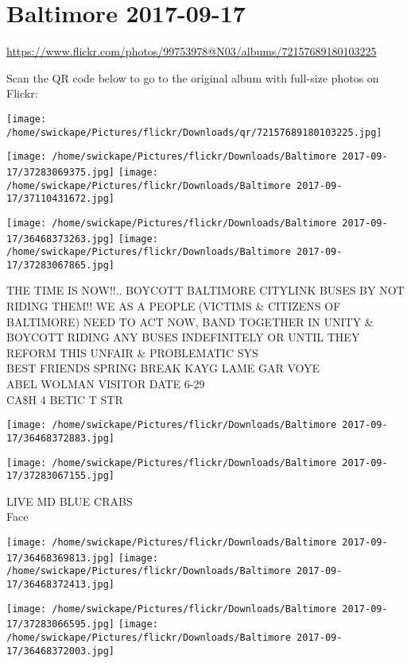 \documentclass[10pt,letterpaper]{article}
\title{}
\author{}
\date{}
\begin{document}
\section*{Baltimore 2017-09-17}

\url{https://www.flickr.com/photos/99753978@N03/albums/72157689180103225}

Scan the QR code below to go to the original album with full-size photos on Flickr:

\texttt{[image: /home/swickape/Pictures/flickr/Downloads/qr/72157689180103225.jpg]}
\pagebreak

\texttt{[image: /home/swickape/Pictures/flickr/Downloads/Baltimore 2017-09-17/37283069375.jpg]}
\texttt{[image: /home/swickape/Pictures/flickr/Downloads/Baltimore 2017-09-17/37110431672.jpg]}

\texttt{[image: /home/swickape/Pictures/flickr/Downloads/Baltimore 2017-09-17/36468373263.jpg]}
\texttt{[image: /home/swickape/Pictures/flickr/Downloads/Baltimore 2017-09-17/37283067865.jpg]}

THE TIME IS NOW!!..  BOYCOTT BALTIMORE CITYLINK BUSES BY NOT RIDING THEM!!  WE AS A PEOPLE (VICTIMS \& CITIZENS OF BALTIMORE) NEED TO ACT NOW, BAND TOGETHER IN UNITY \& BOYCOTT RIDING ANY BUSES INDEFINITELY OR UNTIL THEY REFORM THIS UNFAIR \& PROBLEMATIC SYS\\
BEST FRIENDS SPRING BREAK KAYG LAME GAR VOYE\\
ABEL WOLMAN VISITOR DATE 6{-}29\\
CA\$H 4 BETIC T STR
\pagebreak

\texttt{[image: /home/swickape/Pictures/flickr/Downloads/Baltimore 2017-09-17/36468372883.jpg]}

\vspace{0.25in}
\texttt{[image: /home/swickape/Pictures/flickr/Downloads/Baltimore 2017-09-17/37283067155.jpg]}

LIVE MD BLUE CRABS\\
Face
\pagebreak

\texttt{[image: /home/swickape/Pictures/flickr/Downloads/Baltimore 2017-09-17/36468369813.jpg]}
\texttt{[image: /home/swickape/Pictures/flickr/Downloads/Baltimore 2017-09-17/36468372413.jpg]}

\texttt{[image: /home/swickape/Pictures/flickr/Downloads/Baltimore 2017-09-17/37283066595.jpg]}
\texttt{[image: /home/swickape/Pictures/flickr/Downloads/Baltimore 2017-09-17/36468372003.jpg]}
\end{document}
